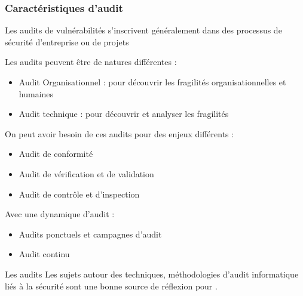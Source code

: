 \begin{frame}
\frametitle<presentation>{Caractéristiques d'audit}

Les audits de vulnérabilités s'inscrivent généralement dans des processus de sécurité d'entreprise ou de projets

Les audits peuvent être de natures différentes :

\begin{itemize}
  \item Audit Organisationnel : pour découvrir les fragilités organisationnelles et humaines
  \item Audit technique : pour découvrir et analyser les fragilités 
\end{itemize}

On peut avoir besoin de ces audits pour des enjeux différents :

\begin{itemize}
  \item Audit de conformité
  \item Audit de vérification et de validation
  \item Audit de contrôle et d'inspection
\end{itemize}

Avec une dynamique d'audit :  

\begin{itemize}
 	\item  Audits ponctuels et campagnes d'audit
	\item  Audit continu
\end{itemize}

\end{frame}

\begin{techworkbox}{Les audits}
 Les sujets autour des techniques, méthodologies d'audit informatique liés à la sécurité sont une bonne source de réflexion pour \fichetech.
\end{techworkbox}





